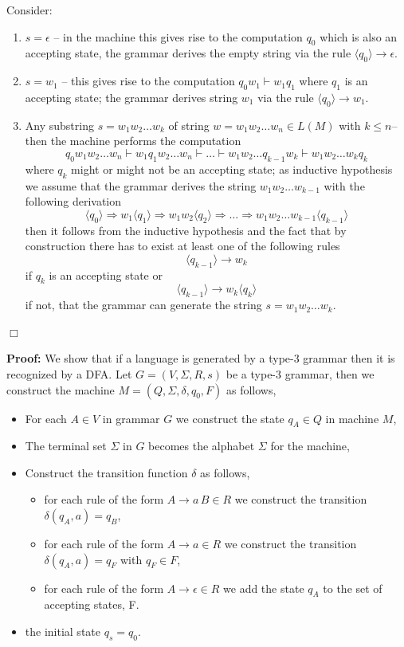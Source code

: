 \documentclass[a4paper,blends,pdf,colorBG,slideColor]{prosper}
\begin{document}
\scriptsize
Consider:
\begin{enumerate}
\item $s=\epsilon$ -- in the machine this gives rise to the computation $q_0$ which is also an accepting state, the grammar derives the empty string via the rule $\langle q_0\rangle \rightarrow \epsilon$.
\item $s=w_1$ -- this gives rise to the computation $q_0 w_1 \vdash  w_1 q_1$ where $q_1$ is an accepting state;
the grammar derives string $w_1$ via the rule $\langle q_0\rangle \rightarrow  w_1$.
\item Any substring $s=w_1 w_2\ldots w_k$ of string $w=w_1 w_2\ldots w_n\in L(M)$ with $k \le n$-- then the machine performs the computation
\[
q_0 w_1 w_2 \ldots w_n \vdash  w_1 q_1 w_2 \ldots w_n \vdash  \ldots  \vdash 
 w_1 w_2 \ldots q_{k-1}w_k \vdash  w_1 w_2 \ldots w_k q_k
\]
where $q_k$ might or might not be an accepting state;
as inductive hypothesis
we assume that the grammar derives the string $w_1 w_2 \ldots w_{k-1}$ with the following derivation
\[
\langle q_0\rangle \Rightarrow w_1\langle q_1\rangle \Rightarrow w_1 w_2\langle q_2 \rangle \Rightarrow \ldots 
\Rightarrow w_1 w_2 \ldots w_{k-1} \langle q_{k-1}\rangle 
\]
then it follows from the inductive hypothesis and the fact that by construction there has to exist at least one of the
following rules
\[
\langle q_{k-1}\rangle \rightarrow w_k
\]
if $q_k$ is an accepting state or
\[
\langle q_{k-1}\rangle \rightarrow w_k\langle q_{k}\rangle
\]
if not,
that the grammar can generate the string $s=w_1 w_2\ldots w_k$.
\end{enumerate}
$\Box$
\es



{\bf Proof:} We show that if a language is generated by a type-3 grammar then it is recognized by a DFA.
Let $G =(V,\Sigma,R,s)$ be a type-3 grammar, then we construct the machine $M = (Q,\Sigma,\delta,q_0,F)$
as follows,
\begin{itemize}
\item For each $A \in V$ in grammar $G$ we construct the state $q_A\in Q$ in machine $M$,
\item The terminal set $\Sigma$ in $G$ becomes the alphabet $\Sigma$ for the machine,
\item Construct the transition function $\delta$ as follows,
\begin{itemize}
\item for each rule of the form $A \rightarrow a\, B \in R$ we construct the transition $\delta(q_A,a) = q_B$,
\item for each rule of the form $A \rightarrow a \in R$ we construct the transition $\delta(q_A,a) = q_F$ with
$q_F \in F$,
\item for each rule of the form $A \rightarrow \epsilon \in R$ we add the state $q_A$ to the set of accepting states, F.
\end{itemize}
\item the initial state $q_s = q_0$.
\end{itemize}
\end{document}
